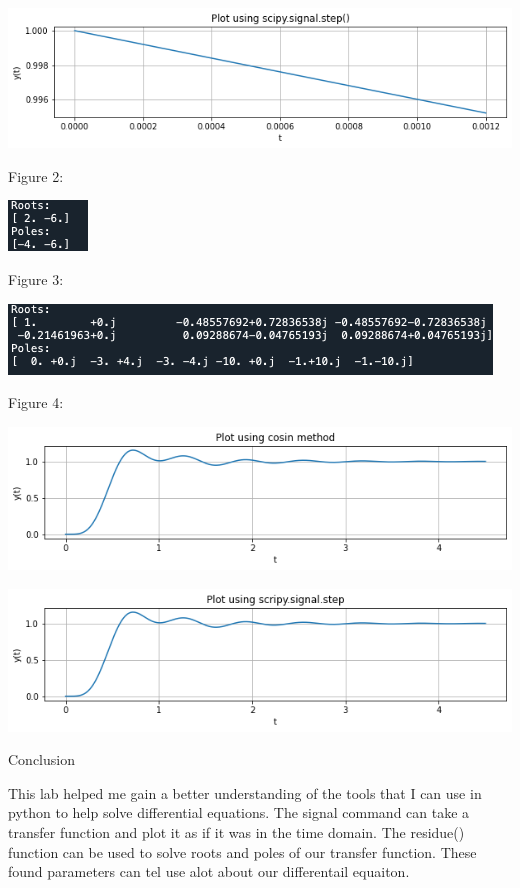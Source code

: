 \documentclass[nobib]{MSword}
\begin{document}
\includegraphics[scale = 0.50]
{txt/Lab6Fig1.5.png}

Figure 2:

\includegraphics[scale = 0.75]
{txt/Lab6Fig2.png}

Figure 3: 

\includegraphics[scale = 0.75]
{txt/Lab6Fig3.png}

Figure 4:

\includegraphics[scale = 0.5]
{txt/Lab6Fig4.png}

\includegraphics[scale = 0.5]
{txt/Lab6Fig4.5.png}

\begin{center}
    Conclusion
\end{center}
    This lab helped me gain a better understanding of the tools that I can use in python to help solve differential equations. The signal command can take a transfer function and plot it as if it was in the time domain. The residue() function can be used to solve roots and poles of our transfer function. These found parameters can tel use alot about our differentail equaiton.
\end{document}
